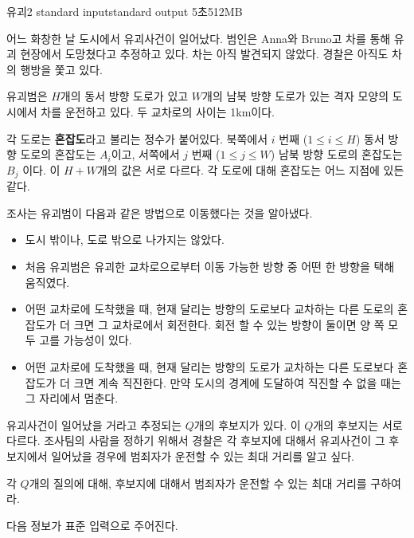 \begin{problem}{유괴2}
	{standard input}{standard output}
	{5초}{512MB}{}
	
	어느 화창한 날 도시에서 유괴사건이 일어났다. 범인은 Anna와 Bruno고 차를 통해 유괴 현장에서 도망쳤다고 추정하고 있다. 차는 아직 발견되지 않았다. 경찰은 아직도 차의 행방을 쫓고 있다.
	
	유괴범은 $H$개의 동서 방향 도로가 있고 $W$개의 남북 방향 도로가 있는 격자 모양의 도시에서 차를 운전하고 있다. 두 교차로의 사이는 1km이다.
	
	각 도로는 \textbf{혼잡도}라고 불리는 정수가 붙어있다. 북쪽에서 $i$ 번째 ($1 \le i \le H$) 동서 방향 도로의 혼잡도는 $A_i$이고, 서쪽에서 $j$ 번째 ($1 \le j \le W$) 남북 방향 도로의 혼잡도는 $B_j$ 이다. 이 $H+W$개의 값은 서로 다르다. 각 도로에 대해 혼잡도는 어느 지점에 있든 같다.
	
	조사는 유괴범이 다음과 같은 방법으로 이동했다는 것을 알아냈다.
	
	\begin{itemize}
		\item 도시 밖이나, 도로 밖으로 나가지는 않았다.
		\item 처음 유괴범은 유괴한 교차로으로부터 이동 가능한 방향 중 어떤 한 방향을 택해 움직였다.
		\item 어떤 교차로에 도착했을 때, 현재 달리는 방향의 도로보다 교차하는 다른 도로의 혼잡도가 더 크면 그 교차로에서 회전한다. 회전 할 수 있는 방향이 둘이면 양 쪽 모두 고를 가능성이 있다.
		\item 어떤 교차로에 도착했을 때, 현재 달리는 방향의 도로가 교차하는 다른 도로보다 혼잡도가 더 크면 계속 직진한다. 만약 도시의 경계에 도달하여 직진할 수 없을 때는 그 자리에서 멈춘다.
	\end{itemize}

	유괴사건이 일어났을 거라고 추정되는 $Q$개의 후보지가 있다. 이 $Q$개의 후보지는 서로 다르다. 조사팀의 사람을 정하기 위해서 경찰은 각 후보지에 대해서 유괴사건이 그 후보지에서 일어났을 경우에 범죄자가 운전할 수 있는 최대 거리를 알고 싶다.
	
	각 $Q$개의 질의에 대해, 후보지에 대해서 범죄자가 운전할 수 있는 최대 거리를 구하여라. 
		
	\InputFile
	
	다음 정보가 표준 입력으로 주어진다.
	

\end{problem}
